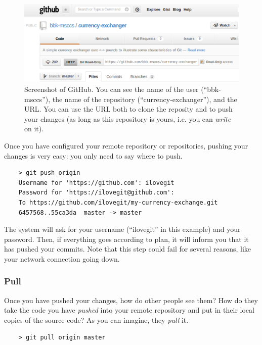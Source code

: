 \begin{figure}[htbp]
  \centering
  \includegraphics[width=\textwidth]{gfx/gitHubScreenshot.eps}
  \caption{Screenshot of GitHub. You can see the name of the user
    (``bbk-msccs''), the name of the repository
    (``currency-exchanger''), and the URL. You can use the URL both to
    clone the reposity and to push your changes (as long as this
    repository is yours, i.e. you can \emph{write} on it).}
  \label{fig:github}
\end{figure}

Once you have configured your remote repository or repositories,
pushing your changes is very easy: you only need to say where to push. 

\begin{verbatim}
    > git push origin 
    Username for 'https://github.com': ilovegit
    Password for 'https://ilovegit@github.com':
    To https://github.com/ilovegit/my-currency-exchange.git
    6457568..55ca3da  master -> master
\end{verbatim}

The system will ask for your username (``ilovegit'' in this example)
and your password. Then, if everything goes according to plan, 
it will inform you that it has pushed your commits. Note that 
this step could
fail for several reasons, like your network connection going down. 

\subsubsection{Pull}
\label{sec:pull}

Once you have pushed your changes, how do other people see them? How
do they take the code you have \emph{pushed} into your remote
repository and put in their local copies of the source code? As you
can imagine, they \emph{pull} it. 

\begin{verbatim}
    > git pull origin master
\end{verbatim}


